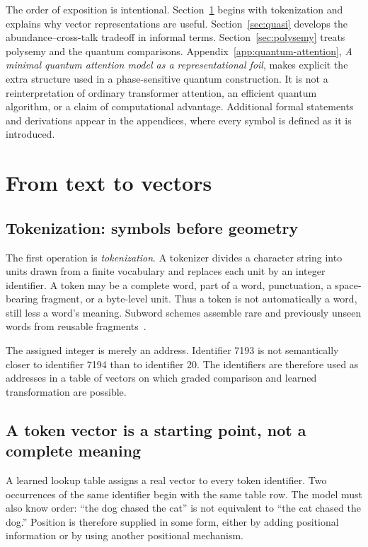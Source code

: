 \documentclass[
  aps,
  reprint,
  superscriptaddress,
  floatfix,
  nofootinbib,
  longbibliography
]{revtex4-2}
\begin{document}
The order of exposition is intentional.  Section~\ref{sec:vectors} begins
with tokenization and explains why vector representations are useful.
Section~\ref{sec:quasi} develops the abundance--cross-talk tradeoff in
informal terms.  Section~\ref{sec:polysemy} treats polysemy and the quantum
comparisons.  Appendix~\ref{app:quantum-attention}, \emph{A minimal quantum
attention model as a representational foil}, makes explicit the extra
structure used in a phase-sensitive quantum construction.  It is not a
reinterpretation of ordinary transformer attention, an efficient quantum
algorithm, or a claim of computational advantage.  Additional formal
statements and derivations appear in the
appendices, where every symbol is defined as it is introduced.

\section{From text to vectors}
\label{sec:vectors}

\subsection{Tokenization: symbols before geometry}

The first operation is \emph{tokenization}.  A tokenizer divides a character
string into units drawn from a finite vocabulary and replaces each unit by an
integer identifier.  A token may be a complete word, part of a word,
punctuation, a space-bearing fragment, or a byte-level unit.  Thus a token is
not automatically a word, still less a word's meaning.  Subword schemes
assemble rare and previously unseen words from reusable
fragments~\cite{sennrich2016subword}.

The assigned integer is merely an address.  Identifier 7193 is not
semantically closer to identifier 7194 than to identifier 20.  The identifiers
are therefore used as addresses in a table of vectors on which graded
comparison and learned transformation are possible.

\subsection{A token vector is a starting point, not a complete meaning}

A learned lookup table assigns a real vector to every token identifier.  Two
occurrences of the same identifier begin with the same table row.  The model
must also know order: ``the dog chased the cat'' is not equivalent to ``the
cat chased the dog.''  Position is therefore supplied in some form, either by
adding positional information or by using another positional mechanism.
\end{document}
